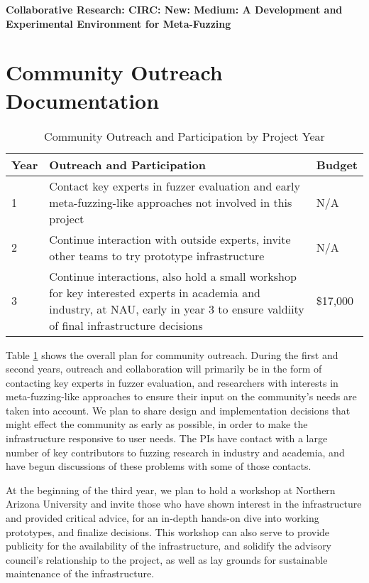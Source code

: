 \documentclass[12pt]{article}
\begin{document}
\begin{center} {\Large\sf\textbf{Collaborative Research: CIRC: New: Medium: A
      Development and Experimental Environment for Meta-Fuzzing}}
\end{center}

\section*{Community Outreach Documentation}


\begin{table}[b]
  \begin{tabular}{|l|p{10cm}|l|}
    {\bf Year} & {\bf Outreach and Participation} & {Budget} \\
    \hline
    1 & Contact key experts in fuzzer evaluation and early meta-fuzzing-like
        approaches not involved in this project & N/A \\
    2 & Continue interaction with outside experts, invite other teams to try
        prototype infrastructure & N/A \\
    3 & Continue interactions, also hold a small workshop for key interested
        experts in academia and industry, at NAU, early in year 3 to ensure
        valdiity of final infrastructure decisions & \$17,000 \\
  \end{tabular}
  \caption{Community Outreach and Participation by Project Year}
  \label{tab:outreach}
  
\end{table}


Table \ref{tab:outreach} shows the overall plan for community outreach.  During
the first and second years, outreach and collaboration will primarily be in the
form of contacting key experts in fuzzer evaluation, and researchers with
interests in meta-fuzzing-like approaches to ensure their input on the
community's needs are taken into account.  We plan to share design and
implementation decisions that might effect the community as early as possible,
in order to make the infrastructure responsive to user needs.  The PIs have
contact with a large number of key contributors to fuzzing research in industry
and academia, and have begun discussions of these problems with some of those
contacts.

At the beginning of the third year, we plan to hold a workshop at Northern
Arizona University and invite those who have shown interest in the
infrastructure and provided critical advice, for an in-depth hands-on dive into
working prototypes, and finalize decisions.  This workshop can also serve to
provide publicity for the availability of the infrastructure, and solidify the
advisory council's relationship to the project, as well as lay grounds for
sustainable maintenance of the infrastructure.
\end{document}
